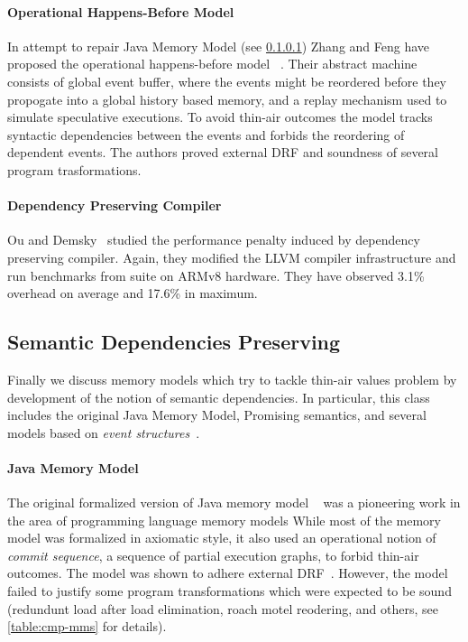 \paragraph{Operational Happens-Before Model}

In attempt to repair Java Memory Model (see \cref{sec:catalog:jmm})
Zhang and Feng have proposed the 
operational happens-before model \OHMM~\cite{Zhang-Feng:FCS16}.
Their abstract machine consists of global event buffer,
where the events might be reordered before they propogate into  
a global history based memory, and a replay mechanism 
used to simulate speculative executions. 
To avoid thin-air outcomes the model tracks syntactic dependencies 
between the events and forbids the reordering of dependent events. 
The authors proved external DRF and soundness of several 
program trasformations. 

\paragraph{Dependency Preserving Compiler}

Ou and Demsky~\cite{Ou-Demsky:OOPSLA18} studied 
the performance penalty induced by dependency preserving compiler. 
Again, they modified the LLVM compiler infrastructure 
and run benchmarks from \SPECCPU suite on ARMv8 hardware. 
They have observed 3.1\% overhead on average and 17.6\% in maximum. 

\subsection{Semantic Dependencies Preserving}
\label{sec:catalog:sdeprf}

Finally we discuss memory models 
which try to tackle thin-air values problem 
by development of the notion of semantic dependencies. 
In particular, this class includes the original Java Memory Model, 
Promising semantics, and several models based 
on \emph{event structures}~\cite{Winskel:86}.

\paragraph{Java Memory Model}
\label{sec:catalog:jmm}

The original formalized version of Java memory model \JMM~\cite{Manson-al:POPL05}
was a pioneering work in the area of programming language memory models 
While most of the memory model was formalized in axiomatic style, 
it also used an operational notion of \emph{commit sequence}, 
\ie a sequence of partial execution graphs, to forbid thin-air outcomes. 
The model was shown to adhere external DRF~\cite{Huisman-Petri:CONCUR07}.
However, the model failed to justify some program transformations 
which were expected to be sound~\cite{Sevcik-Aspinall:ECOOP08} 
(\eg redundunt load after load elimination, roach motel reodering, and others,
see \cref{table:cmp-mms} for details). 

